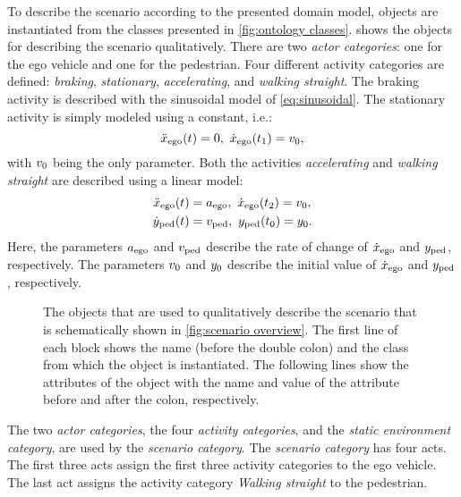 To describe the scenario according to the presented domain model, objects are instantiated from the classes presented in \cref{fig:ontology classes}.  shows the objects for describing the scenario qualitatively. There are two \textit{actor categories}: one for the ego vehicle and one for the pedestrian. Four different activity categories are defined: \emph{braking}, \emph{stationary}, \emph{accelerating}, and \emph{walking straight}. The braking activity is described with the sinusoidal model of \cref{eq:sinusoidal}. The stationary activity is simply modeled using a constant, i.e.:
\begin{equation} \label{eq:constant model}
	\ddot{x}_{\mathrm{ego}}(t) = 0,\ \dot{x}_{\mathrm{ego}}(t_{1}) = v_{0},
\end{equation}
with $v_{0}$ being the only parameter.
Both the activities \emph{accelerating} and \emph{walking straight} are described using a linear model:
\begin{align}
	\ddot{x}_{\mathrm{ego}}(t) &= a_{\mathrm{ego}},\ \dot{x}_{\mathrm{ego}}(t_{2}) = v_{0}, \label{eq:ego accelerating} \\
	\dot{y}_{\mathrm{ped}}(t) &= v_{\mathrm{ped}},\ y_{\mathrm{ped}}(t_{0}) = y_{0}. \label{eq:pedestrian walking}
\end{align}
Here, the parameters $a_{\mathrm{ego}}$ and $v_{\mathrm{ped}}$ describe the rate of change of $\dot{x}_{\mathrm{ego}}$ and $y_{\mathrm{ped}}$, respectively. The parameters $v_{0}$ and $y_{0}$ describe the initial value of $\dot{x}_{\mathrm{ego}}$ and $y_{\mathrm{ped}}$, respectively.


\begin{figure}
	\centering
	
	\caption{The objects that are used to qualitatively describe the scenario that is schematically shown in \cref{fig:scenario overview}. The first line of each block shows the name (before the double colon) and the class from which the object is instantiated. The following lines show the attributes of the object with the name and value of the attribute before and after the colon, respectively.}
	\label{fig:example qualitative}
\end{figure}


The two \textit{actor categories}, the four \textit{activity categories}, and the \textit{static environment category}, are used by the \textit{scenario category}. The \textit{scenario category} has four acts. The first three acts assign the first three activity categories to the ego vehicle. The last act assigns the activity category \emph{Walking straight} to the pedestrian. 



